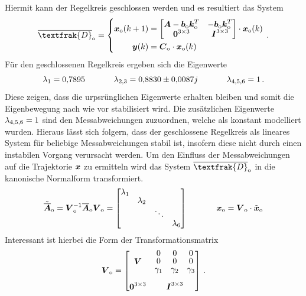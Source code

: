 Hiermit kann der Regelkreis geschlossen werden und es resultiert das System
\begin{equation}
\overline{\textfrak{D}}\idx{o} = \left\{ \begin{split}
\bs{x}\idx{o}(k+1) &= \begin{bmatrix}
\bs{A}-\bs{b}\idx{o}\bs{k}^T\idx{o} & -\bs{b}\idx{o}\bs{k}^T\idx{o} \\
\bs{0}^{3\times 3} & \bs{I}^{3\times 3}
\end{bmatrix}\cdot \bs{x}\idx{o}(k)
\\
\bs{y}(k) &= \bs{C}\idx{o}\cdot \bs{x}\idx{o}(k)
\end{split}\right.
\,.
\end{equation}
Für den geschlossenen Regelkreis ergeben sich die Eigenwerte
\begin{equation}
\lambda_{\text{1}} = 0{,}7895 \hspace{35pt} \lambda_{\text{2,3}} = 0{,}8830 \pm 0{,}0087j \hspace{35pt} \lambda_{\text{4,5,6}} = 1
\,.
\end{equation}
Diese zeigen, dass die urpsrünglichen Eigenwerte erhalten bleiben und somit die Eigenbewegung nach wie vor stabilisiert wird. Die zusätzlichen Eigenwerte $\lambda_{\text{4,5,6}}=1$ sind den Messabweichungen zuzuordnen, welche als konstant modelliert wurden. Hieraus lässt sich folgern, dass der geschlossene Regelkreis als lineares System für beliebige Messabweichungen stabil ist, insofern diese nicht durch einen instabilen Vorgang verursacht werden. Um den Einfluss der Messabweichungen auf die Trajektorie $\boldsymbol{x}$ zu ermitteln wird das System $\overline{\textfrak{D}}\idx{o}$ in die kanonische Normalform transformiert.
\begin{equation}
\tilde{\overline{\bs{A}}}\idx{o} = \bs{V}^{-1}\idx{o}\overline{\bs{A}}\idx{o}\bs{V}\idx{o} = \begin{bmatrix}
\lambda\idx1 & & & \\
 & \lambda\idx2 & & \\
 & & \ddots & \\
 & & & \lambda\idx6
\end{bmatrix}
\hspace{35pt} 
\bs{x}\idx{o} = \bs{V}\idx{o}\cdot \tilde{\bs{x}}\idx{o}
\end{equation}
Interessant ist hierbei die Form der Transformationsmatrix
\begin{equation}
\renewcommand*{\arraystretch}{0.8}
\bs{V}\idx{o} = \begin{bmatrix}
\bs{V} & \begin{matrix} 0 & 0 & 0 \\ 0 & 0 & 0 \\ \gamma\idx1 & \gamma\idx2 & \gamma\idx3 \end{matrix} 
\\ \\
\bs{0}^{3\times 3} & \bs{I}^{3\times 3}
\end{bmatrix}
\,.
\end{equation}
